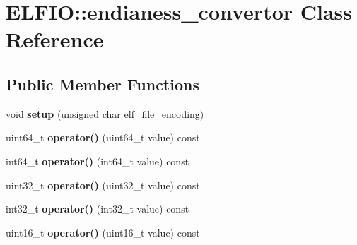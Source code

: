 \hypertarget{class_e_l_f_i_o_1_1endianess__convertor}{}\section{E\+L\+F\+IO\+:\+:endianess\+\_\+convertor Class Reference}
\label{class_e_l_f_i_o_1_1endianess__convertor}
\subsection*{Public Member Functions}
\begin{DoxyCompactItemize}
\item 
void {\bfseries setup} (unsigned char elf\+\_\+file\+\_\+encoding)\hypertarget{class_e_l_f_i_o_1_1endianess__convertor_a67d470a1b50e356dba4666781872a090}{}\label{class_e_l_f_i_o_1_1endianess__convertor_a67d470a1b50e356dba4666781872a090}

\item 
uint64\+\_\+t {\bfseries operator()} (uint64\+\_\+t value) const \hypertarget{class_e_l_f_i_o_1_1endianess__convertor_ac61eaaa10259a5ac9851dc31e4cd5788}{}\label{class_e_l_f_i_o_1_1endianess__convertor_ac61eaaa10259a5ac9851dc31e4cd5788}

\item 
int64\+\_\+t {\bfseries operator()} (int64\+\_\+t value) const \hypertarget{class_e_l_f_i_o_1_1endianess__convertor_a26be52546459428a29905d3608ea4387}{}\label{class_e_l_f_i_o_1_1endianess__convertor_a26be52546459428a29905d3608ea4387}

\item 
uint32\+\_\+t {\bfseries operator()} (uint32\+\_\+t value) const \hypertarget{class_e_l_f_i_o_1_1endianess__convertor_a96f8e83d0f479e2fb083270669b5396d}{}\label{class_e_l_f_i_o_1_1endianess__convertor_a96f8e83d0f479e2fb083270669b5396d}

\item 
int32\+\_\+t {\bfseries operator()} (int32\+\_\+t value) const \hypertarget{class_e_l_f_i_o_1_1endianess__convertor_aa06c82471ebf4bd42430f78346708679}{}\label{class_e_l_f_i_o_1_1endianess__convertor_aa06c82471ebf4bd42430f78346708679}

\item 
uint16\+\_\+t {\bfseries operator()} (uint16\+\_\+t value) const \hypertarget{class_e_l_f_i_o_1_1endianess__convertor_ad9abedb0e4a81de10f3797d931ab8ead}{}\label{class_e_l_f_i_o_1_1endianess__convertor_ad9abedb0e4a81de10f3797d931ab8ead}


\end{DoxyCompactItemize}
